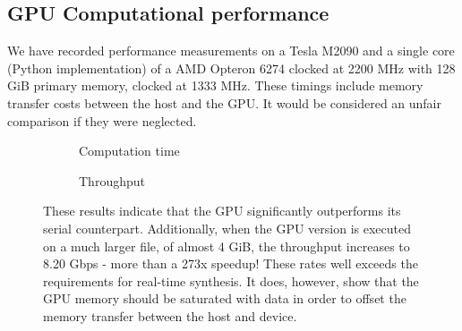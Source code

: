\documentclass[a4paper,10pt]{article}
\begin{document}
\subsection{GPU Computational performance}
We have recorded performance measurements on a Tesla M2090 and a single core (Python implementation) of a AMD Opteron 6274 clocked at 2200 MHz with 128 GiB primary memory, 
clocked at 1333 MHz. These timings include memory transfer costs between the host and the GPU. It would be considered an unfair comparison if they were neglected.
\begin{figure}[ht!]
 \centering
 \begin{subfigure}{0.45\textwidth}
  \caption{Computation time}
  \end{subfigure}
  
  \begin{subfigure}{0.45\textwidth}
  \caption{Throughput}
  \end{subfigure} 
  \caption[GPU performance]{These results indicate that the GPU significantly outperforms its serial counterpart. Additionally, when the GPU version is executed on a much larger
  file, of almost 4 GiB, the throughput increases to 8.20 Gbps - more than a 273x speedup! These rates well exceeds the requirements for real-time synthesis. It does, however, 
  show that the GPU memory should be saturated with data in order to offset the memory transfer between the host and device.}
  \label{computation_times}
\end{figure}
\end{document}
